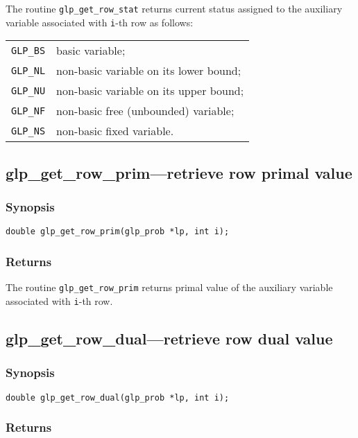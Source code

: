 The routine \verb|glp_get_row_stat| returns current status assigned to
the auxiliary variable associated with \verb|i|-th row as follows:

\begin{tabular}{@{}ll}
\verb|GLP_BS| & basic variable; \\
\verb|GLP_NL| & non-basic variable on its lower bound; \\
\verb|GLP_NU| & non-basic variable on its upper bound; \\
\verb|GLP_NF| & non-basic free (unbounded) variable; \\
\verb|GLP_NS| & non-basic fixed variable. \\
\end{tabular}

\subsection{glp\_get\_row\_prim---retrieve row primal value}

\subsubsection*{Synopsis}

\begin{verbatim}
double glp_get_row_prim(glp_prob *lp, int i);
\end{verbatim}

\subsubsection*{Returns}

The routine \verb|glp_get_row_prim| returns primal value of the
auxiliary variable associated with \verb|i|-th row.

\subsection{glp\_get\_row\_dual---retrieve row dual value}

\subsubsection*{Synopsis}

\begin{verbatim}
double glp_get_row_dual(glp_prob *lp, int i);
\end{verbatim}

\subsubsection*{Returns}

